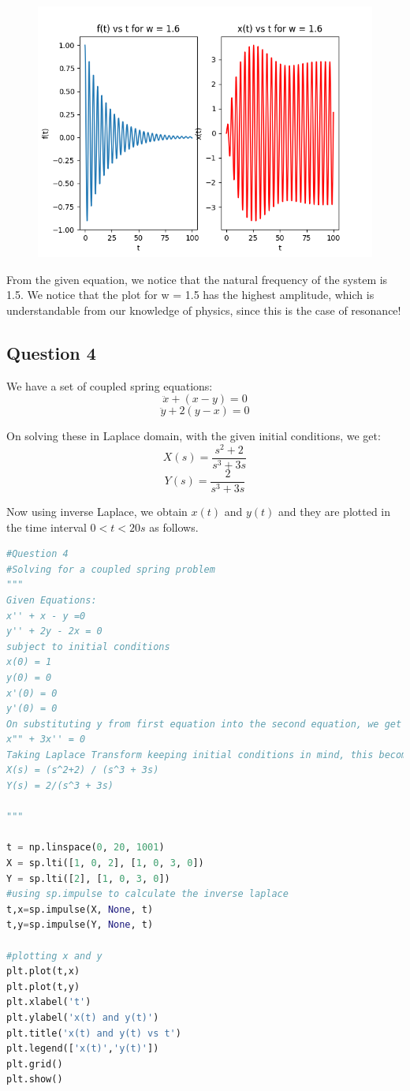 \documentclass[11pt, a4paper]{article}
\begin{document}
\begin{figure}[H]
     \centering
     \includegraphics[scale=0.8]{Figure_7.png}
\end{figure}


From the given equation, we notice that the natural frequency of the system is 1.5. We notice that the plot for w = 1.5 has the  highest amplitude, which is understandable from our knowledge of physics, since this is the case of resonance!



\subsection{Question 4}
We have a set of coupled spring equations:
\[\ddot{x} + (x-y) = 0\]
\[\ddot{y} + 2(y-x) = 0\]

On solving these in Laplace domain, with the given initial conditions, we get:
\[X(s) = \frac{s^2+2}{s^3+3s}\]
\[Y(s) = \frac{2}{s^3+3s}\]

Now using inverse Laplace, we obtain $x(t)$ and $y(t)$ and they are plotted in the time interval $0 < t < 20s$ as follows.


\begin{lstlisting}[language = Python]
#Question 4
#Solving for a coupled spring problem
"""
Given Equations:
x'' + x - y =0
y'' + 2y - 2x = 0
subject to initial conditions
x(0) = 1
y(0) = 0
x'(0) = 0
y'(0) = 0
On substituting y from first equation into the second equation, we get
x"" + 3x'' = 0
Taking Laplace Transform keeping initial conditions in mind, this becomes, 
X(s) = (s^2+2) / (s^3 + 3s)
Y(s) = 2/(s^3 + 3s)

"""

t = np.linspace(0, 20, 1001)
X = sp.lti([1, 0, 2], [1, 0, 3, 0])
Y = sp.lti([2], [1, 0, 3, 0])
#using sp.impulse to calculate the inverse laplace
t,x=sp.impulse(X, None, t)
t,y=sp.impulse(Y, None, t)

#plotting x and y
plt.plot(t,x)
plt.plot(t,y)
plt.xlabel('t')
plt.ylabel('x(t) and y(t)')
plt.title('x(t) and y(t) vs t')
plt.legend(['x(t)','y(t)'])
plt.grid()
plt.show()



\end{lstlisting}
\end{document}

